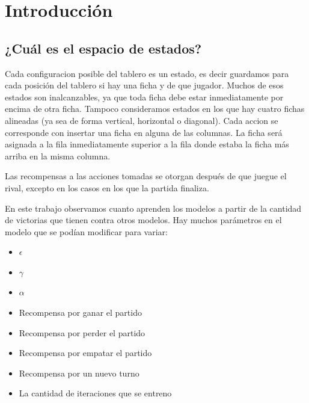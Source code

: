\documentclass[10pt, a4paper]{article}
\begin{document}
\fecha{\today}

\maketitle
\tableofcontents
\newpage

\section{Introducción}

\subsection{¿Cuál es el espacio de estados?}

Cada configuracion posible del tablero es un estado, es decir guardamos para cada posición del tablero si hay una ficha y de que jugador. Muchos de esos estados son inalcanzables, ya que toda ficha debe estar inmediatamente por encima de otra ficha. Tampoco consideramos estados en los que hay cuatro fichas alineadas (ya sea de forma vertical, horizontal o diagonal). 
Cada accion se corresponde con insertar una ficha en alguna de las columnas. La ficha será asignada a la fila inmediatamente superior a la fila donde estaba la ficha más arriba en la misma columna.

Las recompensas a las acciones tomadas se otorgan después de que juegue el rival, excepto en los casos en los que la partida finaliza.


En este trabajo observamos cuanto aprenden los modelos a partir de la cantidad de victorias que tienen contra otros modelos.
Hay muchos parámetros en el modelo que se podían modificar para variar:
\begin{itemize}
	\item $\epsilon$
	\item $\gamma$
	\item $\alpha$
	\item Recompensa por ganar el partido
	\item Recompensa por perder el partido
	\item Recompensa por empatar el partido
	\item Recompensa por un nuevo turno
	\item La cantidad de iteraciones que se entreno

\end{itemize}
\end{document}
